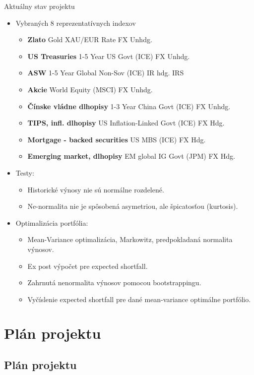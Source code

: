\documentclass{Bredelebeamer}
\begin{document}
\begin{frame}{Aktuálny stav projektu}
	\begin{itemize}
		\item Vybraných 8 reprezentatívnych indexov
		\begin{itemize}
			\item \textbf{Zlato} Gold XAU/EUR Rate FX Unhdg.
			\item \textbf{US Treasuries }1-5 Year US Govt (ICE) FX Unhdg.
			\item\textbf{ASW} 1-5 Year Global Non-Sov (ICE) IR hdg. IRS
			\item \textbf{Akcie } World Equity (MSCI) FX Unhdg.
			\item \textbf{Čínske vládne dlhopisy}  1-3 Year China Govt (ICE) FX Unhdg.
			\item \textbf{TIPS, infl. dlhopisy } US Inflation-Linked Govt (ICE) FX Hdg.
			\item \textbf{Mortgage - backed securities} US MBS (ICE) FX Hdg.
			\item \textbf{Emerging market, dlhopisy} EM global IG Govt (JPM) FX Hdg.
		\end{itemize}
		\pause\item Testy:
		\begin{itemize}
			\item Historické výnosy nie sú normálne rozdelené.
			\item Ne-normalita nie je spôsobená asymetriou, ale špicatosťou (kurtosis).
		\end{itemize}
		\pause\item Optimalizácia portfólia:
		\begin{itemize}
			\item Mean-Variance optimalizácia, Markowitz, predpokladaná normalita výnosov.
			\item Ex post výpočet pre expected shortfall.
			\item Zahrnutá nenormalita výnosov pomocou bootstrappingu.
			\item Vyčíslenie expected shortfall pre dané mean-variance optimálne portfólio.
		\end{itemize}
	\end{itemize}
\end{frame}

\section{Plán projektu}
\subsection{Plán projektu}
\end{document}
